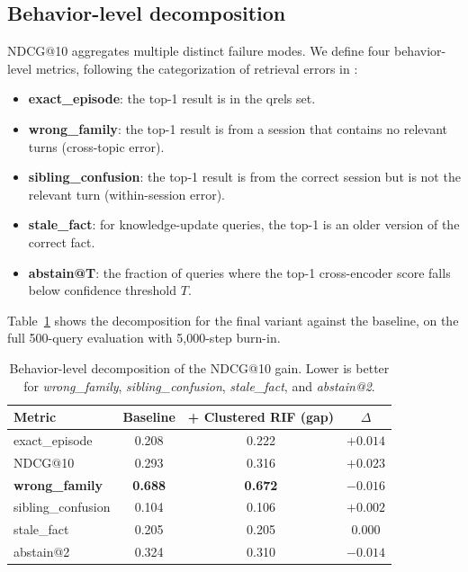 \documentclass[11pt,a4paper]{article}
\begin{document}
\subsection{Behavior-level decomposition}
\label{sec:behavior}

NDCG@10 aggregates multiple distinct failure modes. We define four behavior-level metrics, following the categorization of retrieval errors in \citet{wu2024longmemeval}:

\begin{itemize}
  \item \textbf{exact\_episode}: the top-1 result is in the qrels set.
  \item \textbf{wrong\_family}: the top-1 result is from a session that contains no relevant turns (cross-topic error).
  \item \textbf{sibling\_confusion}: the top-1 result is from the correct session but is not the relevant turn (within-session error).
  \item \textbf{stale\_fact}: for knowledge-update queries, the top-1 is an older version of the correct fact.
  \item \textbf{abstain@T}: the fraction of queries where the top-1 cross-encoder score falls below confidence threshold $T$.
\end{itemize}

Table~\ref{tab:behavior} shows the decomposition for the final variant against the baseline, on the full 500-query evaluation with 5{,}000-step burn-in.

\begin{table}[ht]
\centering
\caption{Behavior-level decomposition of the NDCG@10 gain. Lower is better for \emph{wrong\_family}, \emph{sibling\_confusion}, \emph{stale\_fact}, and \emph{abstain@2}.}
\label{tab:behavior}
\begin{tabular}{lccc}
\toprule
Metric & Baseline & + Clustered RIF (gap) & $\Delta$ \\
\midrule
exact\_episode & 0.208 & 0.222 & $+0.014$ \\
NDCG@10 & 0.293 & 0.316 & $+0.023$ \\
\textbf{wrong\_family} & \textbf{0.688} & \textbf{0.672} & $\mathbf{-0.016}$ \\
sibling\_confusion & 0.104 & 0.106 & $+0.002$ \\
stale\_fact & 0.205 & 0.205 & $0.000$ \\
abstain@2 & 0.324 & 0.310 & $-0.014$ \\
\bottomrule
\end{tabular}
\end{table}
\end{document}
